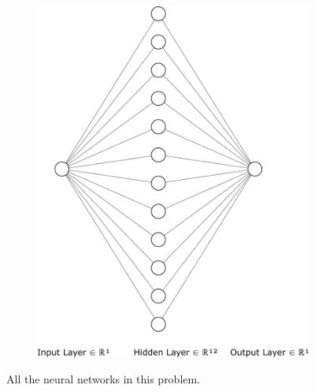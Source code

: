 \begin{figure}[htbp]
\begin{subfigure}{0.47\textwidth}
		\includegraphics[width=\textwidth]{../Problem 4/nn_1_12_1.pdf}
		\caption{}
	\end{subfigure}
	\caption{All the neural networks in this problem.}
	\label{fig:prob4_nns}
\end{figure}